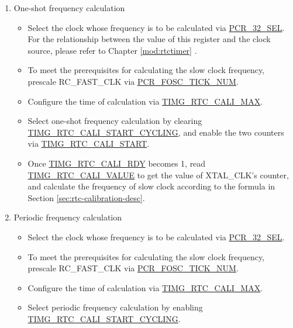 \documentclass[main\_\_EN.tex]{subfiles}
\begin{document}
\begin{enumerate}
    \item One-shot frequency calculation
    \begin{itemize}
        \item Select the clock whose frequency is to be calculated via \hyperref[fielddesc:PCR32KSEL]{PCR\_32\_SEL}. For the relationship between the value of this register and the clock source, please refer to Chapter \ref{mod:rtctimer} \textit{}.

        \item To meet the prerequisites for calculating the slow clock frequency, prescale RC\_FAST\_CLK via \hyperref[fielddesc:PCRFOSCTICKNUM]{PCR\_FOSC\_TICK\_NUM}.

        \item Configure the time of calculation via \hyperref[fielddesc:TIMGRTCCALIMAX]{TIMG\_RTC\_CALI\_MAX}.

        \item Select one-shot frequency calculation by clearing \hyperref[fielddesc:TIMGRTCCALISTARTCYCLING]{TIMG\_RTC\_CALI\_START\_CYCLING}, and enable the two counters via \hyperref[fielddesc:TIMGRTCCALISTART]{TIMG\_RTC\_CALI\_START}.

        \item Once \hyperref[fielddesc:TIMGRTCCALIRDY]{TIMG\_RTC\_CALI\_RDY} becomes 1, read \hyperref[fielddesc:TIMGRTCCALIVALUE]{TIMG\_RTC\_CALI\_VALUE} to get the value of XTAL\_CLK's counter, and calculate the frequency of slow clock according to the formula in Section \ref{sec:rtc-calibration-desc}.
    \end{itemize}
    \item Periodic frequency calculation
    \begin{itemize}
        \item Select the clock whose frequency is to be calculated via \hyperref[fielddesc:PCR32KSEL]{PCR\_32\_SEL}.

        \item To meet the prerequisites for calculating the slow clock frequency, prescale RC\_FAST\_CLK via \hyperref[fielddesc:PCRFOSCTICKNUM]{PCR\_FOSC\_TICK\_NUM}.

        \item Configure the time of calculation via \hyperref[fielddesc:TIMGRTCCALIMAX]{TIMG\_RTC\_CALI\_MAX}.

        \item Select periodic frequency calculation by enabling \hyperref[fielddesc:TIMGRTCCALISTARTCYCLING]{TIMG\_RTC\_CALI\_START\_CYCLING}.


\end{itemize}
\end{enumerate}
\end{document}
